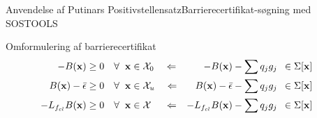 \begin{frame}{Anvendelse af Putinars Positivstellensatz}{Barrierecertifikat-søgning med SOSTOOLS}
\vspace{2mm}
\begin{block}{Omformulering af barrierecertifikat}
	\vspace{-5mm}
	\begin{align*}
	&&	-B(\mathbf{x}) &\geq 0 \quad  \forall \hspace{2mm} \mathbf{x} \in \mathcal{X}_0 \quad \Leftarrow& 	-B(\mathbf{x}) - \sum q_jg_j &\,\,\,\in \Sigma[\mathbf{x}] &&& \\
	&&	B(\mathbf{x})-\bar{\epsilon} &\geq 0 \quad  \forall \hspace{2mm} \mathbf{x} \in \mathcal{X}_u \quad \Leftarrow& 	B(\mathbf{x})-\bar{\epsilon} - \sum q_jg_j &\,\,\,\in \Sigma[\mathbf{x}] &&& \\
	&&	-L_{f_{cl}}B(\mathbf{x}) &\geq 0 \quad  \forall \hspace{2mm} \mathbf{x} \in \mathcal{X} \quad\,\, \Leftarrow& 	-L_{f_{cl}}B(\mathbf{x}) - \sum q_jg_j &\,\,\,\in \Sigma[\mathbf{x}] &&& 
	\end{align*}
\end{block}
\end{frame}

